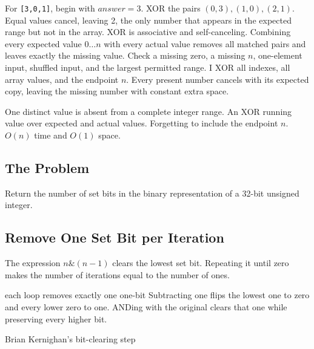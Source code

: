 \lessonexpansion
  {For \texttt{[3,0,1]}, begin with \(answer=3\). XOR the pairs
   \((0,3),(1,0),(2,1)\). Equal values cancel, leaving 2, the only number that
   appears in the expected range but not in the array.}
  {XOR is associative and self-canceling. Combining every expected value
   \(0\ldots n\) with every actual value removes all matched pairs and leaves
   exactly the missing value.}
  {Check a missing zero, a missing \(n\), one-element input, shuffled input,
   and the largest permitted range.}
  {I XOR all indexes, all array values, and the endpoint \(n\). Every present
   number cancels with its expected copy, leaving the missing number with
   constant extra space.}

\chaptercheckpoint
  {One distinct value is absent from a complete integer range.}
  {An XOR running value over expected and actual values.}
  {Forgetting to include the endpoint $n$.}
  {$O(n)$ time and $O(1)$ space.}



\subsection{The Problem}
Return the number of set bits in the binary representation of a 32-bit
unsigned integer.

\subsection{Remove One Set Bit per Iteration}
The expression \(n\mathbin{\&}(n-1)\) clears the lowest set bit. Repeating it
until zero makes the number of iterations equal to the number of ones.

\begin{invariantbox}{each loop removes exactly one one-bit}
Subtracting one flips the lowest one to zero and every lower zero to one.
ANDing with the original clears that one while preserving every higher bit.
\end{invariantbox}

\begin{visualbox}{Brian Kernighan's bit-clearing step}
\centering
{}
\end{visualbox}


